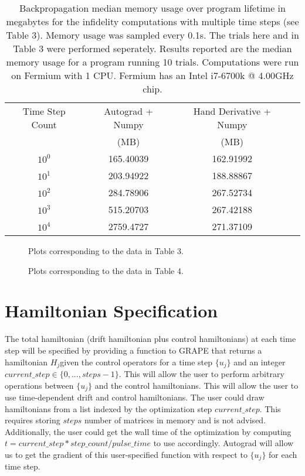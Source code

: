 \documentclass[letterpaper, 12pt]{article}
\begin{document}
\begin{table}
  \begin{center}
    \begin{tabular}{c | c | c | c}
      Time Step Count & Autograd + Numpy & Hand Derivative + Numpy\\
                      & (MB)             & (MB)\\
      \hline
      $10^{0}$        & 165.40039        & 162.91992\\
      $10^{1}$        & 203.94922        & 188.88867\\
      $10^{2}$        & 284.78906        & 267.52734\\
      $10^{3}$        & 515.20703        & 267.42188\\
      $10^{4}$        & 2759.4727        & 271.37109\\
    \end{tabular}
  \end{center}
  \caption{Backpropagation median memory usage over program lifetime in megabytes for the infidelity computations with multiple time steps (see Table 3). Memory usage was sampled every 0.1s. The trials here and in Table 3 were performed seperately. Results reported are the median memory usage for a program running 10 trials. Computations were run on Fermium with 1 CPU. Fermium has an Intel i7-6700k @ 4.00GHz chip.}
\end{table}

\begin{figure}
  \caption{Plots corresponding to the data in Table 3.}
\end{figure}

\begin{figure}
  \caption{Plots corresponding to the data in Table 4.}
\end{figure}

\section{Hamiltonian Specification}
The total hamiltonian (drift hamiltonian plus control hamiltonians) at each time step will be specified by providing a function to GRAPE that returns a hamiltonian $H_{j}$given the control operators for a time step $\{u_{j}\}$ and an integer $current\_step \in \{0, ..., steps - 1\}$. This will allow the user to perform arbitrary operations between $\{u_{j}\}$ and the control hamiltonians. This will allow the user to use time-dependent drift and control hamiltonians. The user could draw hamiltonians from a list indexed by the optimization step $current\_step$. This requires storing $steps$ number of matrices in memory and is not advised. Additionally, the user could get the wall time of the optimization by computing $t = current\_step * step\_count / pulse\_time$ to use accordingly. Autograd will allow us to get the gradient of this user-specified function with respect to $\{u_{j}\}$ for each time step.
\end{document}
